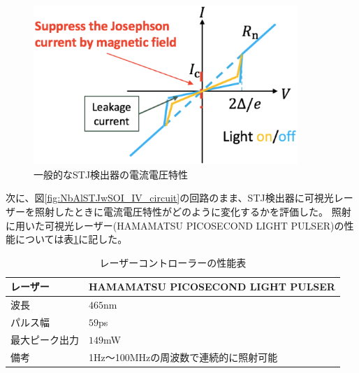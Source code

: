 		\begin{figure}[htbp]
			\begin{center}
				\includegraphics[width=10.0cm]{./Chapter/Chapter4/Picture/STJ_IV.eps}
				\caption{一般的なSTJ検出器の電流電圧特性}
				\label{fig:STJ_IV}
			\end{center}
		\end{figure}
		\clearpage
		
		次に、図\ref{fig:NbAlSTJwSOI_IV_circuit}の回路のまま、STJ検出器に可視光レーザーを照射したときに電流電圧特性がどのように変化するかを評価した。
		照射に用いた可視光レーザー(HAMAMATSU PICOSECOND LIGHT PULSER)の性能については表\ref{tab:lazer}に記した。
		\begin{table}[htb]
			\begin{center}
				\begin{tabular}{| l | l |} \hline
					レーザー & HAMAMATSU PICOSECOND LIGHT PULSER \\ \hline
					波長 & $465 \mathrm{nm}$ \\ \hline
					パルス幅 & $59$ps \\ \hline
					最大ピーク出力 & $149$mW \\ \hline \hline
					備考 & 1Hz〜100MHzの周波数で連続的に照射可能 \\ \hline
				\end{tabular}
				\caption{レーザーコントローラーの性能表}
				\label{tab:lazer}
			\end{center}
		\end{table}
		
